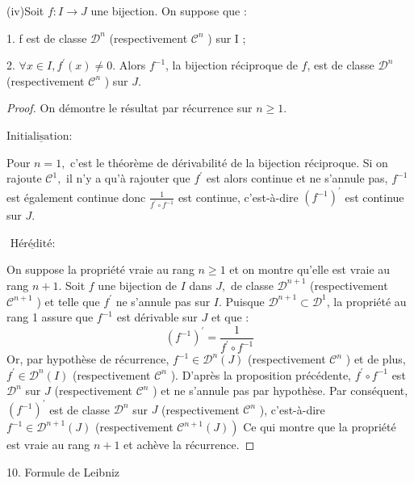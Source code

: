 \documentclass[12pt]{book}
\theoremstyle{definition}\newtheorem{dfn}{Définition}[chapter]
\theoremstyle{plain}\newtheorem{thm}{Théorème}[chapter]
\theoremstyle{plain}\newtheorem{prp}{Proposition}[chapter]
\theoremstyle{plain}\newtheorem{lem}{\bf Lemme}[chapter]
\theoremstyle{plain}\newtheorem{axm}{\bf Axiome}[chapter]
\theoremstyle{plain}\newtheorem{lmm}{\bf Lemme}[chapter]
\theoremstyle{plain}\newtheorem{exm}{\bf Example}[chapter]
\theoremstyle{plain}\newtheorem{cor}{\bf Corollaire}[chapter]
\theoremstyle{remark}\newtheorem{rem}{Remarque}[chapter]
\begin{document}
(iv)Soit $f: I \rightarrow J$ une bijection. On suppose que :

1. f est de classe $\mathcal{D}^{n}$ (respectivement $\mathcal{C}^{n}$ ) sur I ;

2. $\forall x \in I, f^{\prime}(x) \neq 0$.
Alors $f^{-1}$, la bijection réciproque de $f$, est de classe $\mathcal{D}^{n}$ (respectivement $\mathcal{C}^{n}$ ) sur $J$.
\begin{proof}

On démontre le résultat par récurrence sur $n \geqslant 1$. 

$\underline{\text {Initialisation: }}$

Pour $n=1,$ c'est le théorème de dérivabilité de la bijection réciproque. Si on rajoute $\mathcal{C}^{1},$ il n'y a qu'à rajouter que $f^{\prime}$ est alors continue et ne s'annule pas, $f^{-1}$ est également continue donc $\frac{1}{f^{\prime} \circ f^{-1}}$ est continue, c'est-à-dire $\left(f^{-1}\right)^{\prime}$ est continue sur $J$.

$\underline{\text { Hérédité: }}$


On suppose la propriété vraie au rang $n \geqslant 1$ et on montre qu'elle est vraie au rang $n+1$. Soit $f$ une bijection de $I$ dans $J,$ de classe $\mathcal{D}^{n+1}$ (respectivement $\mathcal{C}^{n+1}$ ) et telle que $f^{\prime}$ ne s'annule pas sur $I$. Puisque $\mathcal{D}^{n+1} \subset \mathcal{D}^{1}$, la propriété au rang 1 assure que $f^{-1}$ est dérivable sur $J$ et que :
$$
\left(f^{-1}\right)^{\prime}=\frac{1}{f^{\prime} \circ f^{-1}}
$$
Or, par hypothèse de récurrence, $f^{-1} \in \mathcal{D}^{n}(J)$ (respectivement $\mathcal{C}^{n}$ ) et de plus, $f^{\prime} \in \mathcal{D}^{n}(I)$ (respectivement $\mathcal{C}^{n}$ ). D'après la proposition précédente, $f^{\prime} \circ f^{-1}$ est $\mathcal{D}^{n}$ sur $J$ (respectivement $\mathcal{C}^{n}$ ) et ne s'annule pas par hypothèse. Par conséquent, $\left(f^{-1}\right)^{\prime}$ est de classe $\mathcal{D}^{n}$ sur $J$ (respectivement $\mathcal{C}^{n}$ ), c'est-à-dire $f^{-1} \in \mathcal{D}^{n+1}(J)$ (respectivement $\left.\mathcal{C}^{n+1}(J)\right)$ Ce qui montre que la propriété est vraie au rang $n+1$ et achève la récurrence.

\end{proof}

10. Formule de Leibniz
\end{document}
